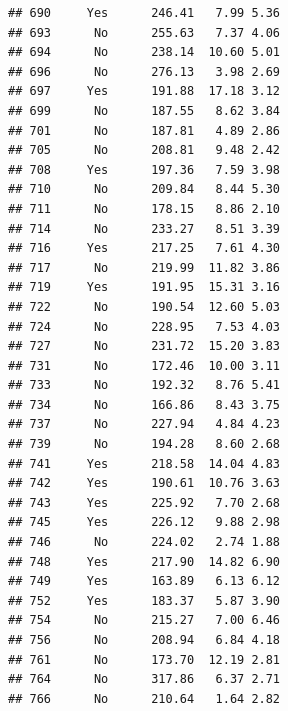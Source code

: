 \documentclass[
]{article}
\begin{document}
\begin{verbatim}
## 690     Yes      246.41   7.99 5.36
## 693      No      255.63   7.37 4.06
## 694      No      238.14  10.60 5.01
## 696      No      276.13   3.98 2.69
## 697     Yes      191.88  17.18 3.12
## 699      No      187.55   8.62 3.84
## 701      No      187.81   4.89 2.86
## 705      No      208.81   9.48 2.42
## 708     Yes      197.36   7.59 3.98
## 710      No      209.84   8.44 5.30
## 711      No      178.15   8.86 2.10
## 714      No      233.27   8.51 3.39
## 716     Yes      217.25   7.61 4.30
## 717      No      219.99  11.82 3.86
## 719     Yes      191.95  15.31 3.16
## 722      No      190.54  12.60 5.03
## 724      No      228.95   7.53 4.03
## 727      No      231.72  15.20 3.83
## 731      No      172.46  10.00 3.11
## 733      No      192.32   8.76 5.41
## 734      No      166.86   8.43 3.75
## 737      No      227.94   4.84 4.23
## 739      No      194.28   8.60 2.68
## 741     Yes      218.58  14.04 4.83
## 742     Yes      190.61  10.76 3.63
## 743     Yes      225.92   7.70 2.68
## 745     Yes      226.12   9.88 2.98
## 746      No      224.02   2.74 1.88
## 748     Yes      217.90  14.82 6.90
## 749     Yes      163.89   6.13 6.12
## 752     Yes      183.37   5.87 3.90
## 754      No      215.27   7.00 6.46
## 756      No      208.94   6.84 4.18
## 761      No      173.70  12.19 2.81
## 764      No      317.86   6.37 2.71
## 766      No      210.64   1.64 2.82
\end{verbatim}
\end{document}

